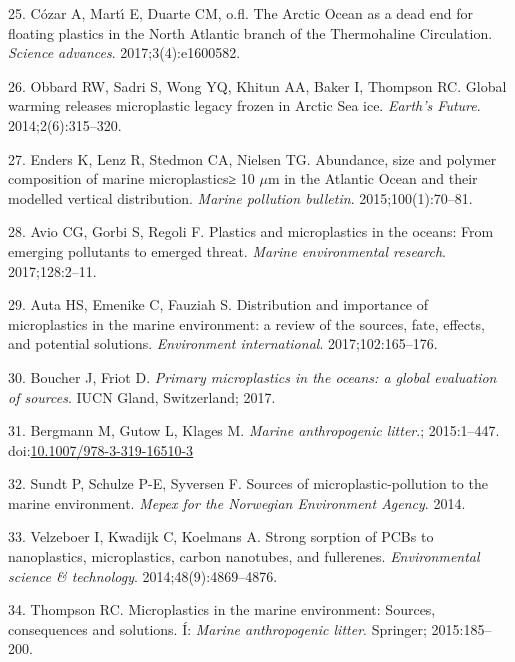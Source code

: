 \documentclass[icelandic,]{book}
\begin{document}
\leavevmode\hypertarget{ref-cozar2017arctic}{}%
25. Cózar A, Martı́ E, Duarte CM, o.fl. The Arctic Ocean as a dead end for floating plastics in the North Atlantic branch of the Thermohaline Circulation. \emph{Science advances}. 2017;3(4):e1600582.

\leavevmode\hypertarget{ref-obbard2014global}{}%
26. Obbard RW, Sadri S, Wong YQ, Khitun AA, Baker I, Thompson RC. Global warming releases microplastic legacy frozen in Arctic Sea ice. \emph{Earth's Future}. 2014;2(6):315--320.

\leavevmode\hypertarget{ref-enders2015abundance}{}%
27. Enders K, Lenz R, Stedmon CA, Nielsen TG. Abundance, size and polymer composition of marine microplastics≥ 10 \(\mu\)m in the Atlantic Ocean and their modelled vertical distribution. \emph{Marine pollution bulletin}. 2015;100(1):70--81.

\leavevmode\hypertarget{ref-avio2017plastics}{}%
28. Avio CG, Gorbi S, Regoli F. Plastics and microplastics in the oceans: From emerging pollutants to emerged threat. \emph{Marine environmental research}. 2017;128:2--11.

\leavevmode\hypertarget{ref-auta2017distribution}{}%
29. Auta HS, Emenike C, Fauziah S. Distribution and importance of microplastics in the marine environment: a review of the sources, fate, effects, and potential solutions. \emph{Environment international}. 2017;102:165--176.

\leavevmode\hypertarget{ref-boucher2017primary}{}%
30. Boucher J, Friot D. \emph{Primary microplastics in the oceans: a global evaluation of sources}. IUCN Gland, Switzerland; 2017.

\leavevmode\hypertarget{ref-Bergmann2015}{}%
31. Bergmann M, Gutow L, Klages M. \emph{Marine anthropogenic litter}.; 2015:1--447. doi:\href{https://doi.org/10.1007/978-3-319-16510-3}{10.1007/978-3-319-16510-3}

\leavevmode\hypertarget{ref-sundt2014sources}{}%
32. Sundt P, Schulze P-E, Syversen F. Sources of microplastic-pollution to the marine environment. \emph{Mepex for the Norwegian Environment Agency}. 2014.

\leavevmode\hypertarget{ref-velzeboer2014strong}{}%
33. Velzeboer I, Kwadijk C, Koelmans A. Strong sorption of PCBs to nanoplastics, microplastics, carbon nanotubes, and fullerenes. \emph{Environmental science \& technology}. 2014;48(9):4869--4876.

\leavevmode\hypertarget{ref-thompson2015microplastics}{}%
34. Thompson RC. Microplastics in the marine environment: Sources, consequences and solutions. Í: \emph{Marine anthropogenic litter}. Springer; 2015:185--200.
\end{document}

